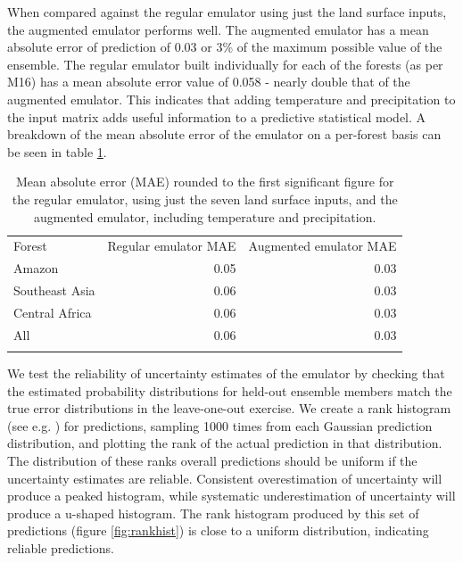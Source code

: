 \documentclass[gmd, manuscript]{copernicus}
\begin{document}
When compared against the regular emulator using just the land surface inputs, the augmented emulator performs well. The augmented emulator has a mean absolute error of prediction of 0.03 or 3\% of the maximum possible value of the ensemble. The regular emulator built individually for each of the forests (as per M16) has a mean absolute error value of 0.058 - nearly double that of the augmented emulator. This indicates that adding temperature and precipitation to the input matrix adds useful information to a predictive statistical model. A breakdown of the mean absolute error of the emulator on a per-forest basis can be seen in table \ref{tab:mae}.



\begin{table}[t]
\caption{Mean absolute error (MAE) rounded to the first significant figure for the regular emulator, using just the seven land surface inputs, and the augmented emulator, including temperature and precipitation.}
\begin{tabular}{lrr}
\tophline

Forest                & Regular emulator MAE & Augmented emulator MAE \\
\middlehline
Amazon              & 0.05                              & 0.03                                     \\
Southeast Asia  & 0.06                               & 0.03                                    \\
Central Africa    & 0.06                               & 0.03                                      \\
All                      & 0.06                              & 0.03                                       \\

\bottomhline
\end{tabular}
\belowtable{} %
\label{tab:mae}
\end{table}

We test the reliability of uncertainty estimates of the emulator by checking that the estimated probability distributions for held-out ensemble members match the true error distributions in the leave-one-out exercise. We create a rank histogram (see e.g. \cite{hamill2001interpretation}) for predictions, sampling 1000 times from each Gaussian prediction distribution, and plotting the rank of the actual prediction in that distribution. The distribution of these ranks overall predictions should be uniform if the uncertainty estimates are reliable. Consistent overestimation of uncertainty will produce a peaked histogram, while systematic underestimation of uncertainty will produce a u-shaped histogram. The rank histogram produced by this set of predictions (figure \ref{fig:rankhist}) is close to a uniform distribution, indicating reliable predictions.
\end{document}
